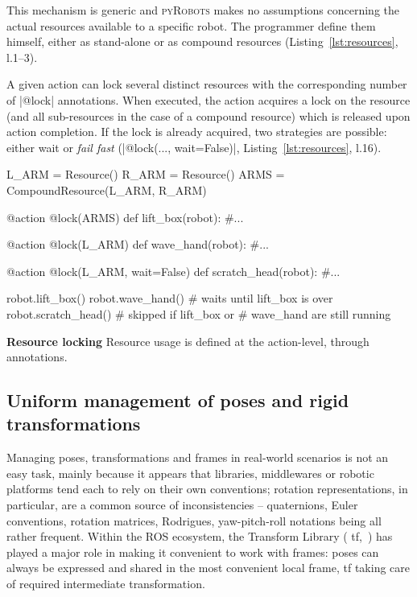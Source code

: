 \documentclass[a4paper, 10pt, conference]{ieeeconf}      %
\newcommand{\pyRobots}{\textsc{pyRobots}}
\begin{document}
This mechanism is generic and \pyRobots{} makes no assumptions concerning the
actual resources available to a specific robot. The
programmer define them himself, either as stand-alone or as compound
resources (Listing~\ref{lst:resources}, l.1--3).

A given action can lock several distinct resources with the corresponding
number of \python|@lock| annotations. When executed, the
action acquires a lock on the resource (and all sub-resources in the case
of a compound resource) which is released upon action completion. If the lock is
already acquired, two strategies are possible: either wait or \emph{fail fast}
(\python|@lock(..., wait=False)|, Listing~\ref{lst:resources}, l.16).

\begin{listing}
\begin{pythoncode}
    L_ARM = Resource()
    R_ARM = Resource()
    ARMS = CompoundResource(L_ARM, R_ARM)

    @action
    @lock(ARMS)
    def lift_box(robot):
        #...

    @action
    @lock(L_ARM)
    def wave_hand(robot):
        #...

    @action
    @lock(L_ARM, wait=False)
    def scratch_head(robot):
        #...

    robot.lift_box()
    robot.wave_hand() # waits until lift_box is over
    robot.scratch_head() # skipped if lift_box or
                         # wave_hand are still running

\end{pythoncode}
\caption{\textbf{Resource locking} Resource usage is defined at the
action-level, through annotations.}

\label{lst:resources}
\end{listing}



\subsection{Uniform management of poses and rigid transformations}

Managing poses, transformations and frames in real-world scenarios is not an
easy task, mainly because it appears that libraries, middlewares or robotic
platforms tend each to rely on their own conventions; rotation representations,
in particular, are a common source of inconsistencies -- quaternions, Euler
conventions, rotation matrices, Rodrigues, yaw-pitch-roll notations being all
rather frequent. Within the ROS ecosystem, the Transform Library ({\sc
tf},~\cite{foote2013tf}) has played a major role in making it convenient to work
with frames: poses can always be expressed and shared in the most convenient
local frame, {\sc tf} taking care of required intermediate transformation.
\end{document}
